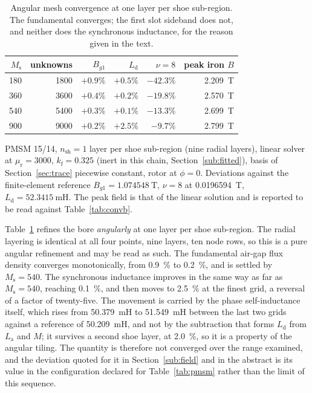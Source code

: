 \documentclass[10pt,a4paper,twocolumn]{article}
\theoremstyle{plain}
\theoremstyle{remark}
\begin{document}
\begin{table}[!t]
\centering
\begin{threeparttable}
\footnotesize
\begin{tabular}{rrrrrr}
\toprule
$M_{\mathrm{s}}$ & unknowns & $B_{g1}$ & $L_{\mathrm{d}}$ & $\nu=8$
& peak iron $B$\\
\midrule
180 & \num{1800} & $+0.9\%$ & $+0.5\%$ & $-42.3\%$ & \SI{2.209}{\tesla}\\
360 & \num{3600} & $+0.4\%$ & $+0.2\%$ & $-19.8\%$ & \SI{2.570}{\tesla}\\
540 & \num{5400} & $+0.3\%$ & $+0.1\%$ & $-13.3\%$ & \SI{2.699}{\tesla}\\
900 & \num{9000} & $+0.2\%$ & $+2.5\%$ & $-9.7\%$  & \SI{2.799}{\tesla}\\
\bottomrule
\end{tabular}
\begin{tablenotes}[flushleft]\footnotesize
\item PMSM 15/14, $n_{\mathrm{sh}}=1$ layer per shoe sub-region (nine radial
layers), linear solver at $\mu_{\mathrm{r}}=\num{3000}$,
$k_{\mathrm{f}}=\num{0.325}$ (inert in this chain, Section~\ref{sub:fitted}), basis of Section~\ref{sec:trace}
piecewise constant, rotor at $\phi=0$. Deviations against the
finite-element reference $B_{g1}=\SI{1.074548}{\tesla}$,
$\nu=8$ at \SI{0.0196594}{\tesla},
$L_{\mathrm{d}}=\SI{52.3415}{\milli\henry}$. The peak field is that of
the linear solution and is reported to be read against
Table~\ref{tab:convb}.
\end{tablenotes}
\end{threeparttable}
\caption{Angular mesh convergence at one layer per shoe sub-region.
The fundamental converges; the first slot sideband does not, and neither
does the synchronous inductance, for the reason given in the text.}
\label{tab:conva}
\end{table}

Table~\ref{tab:conva} refines the bore \emph{angularly} at one layer per
shoe sub-region. The radial layering is identical at all four points, nine layers, ten node rows, so this is a pure angular refinement and
may be read as such. The fundamental air-gap flux density converges
monotonically, from \SI{+0.9}{\percent} to \SI{+0.2}{\percent}, and is
settled by $M_{\mathrm{s}}=540$. The synchronous inductance improves in
the same way as far as $M_{\mathrm{s}}=540$, reaching
\SI{+0.1}{\percent}, and then moves to \SI{+2.5}{\percent} at the finest
grid, a reversal of a factor of twenty-five. The movement is carried by
the phase self-inductance itself, which rises from \SI{50.379}{\milli\henry}
to \SI{51.549}{\milli\henry} between the last two grids against a
reference of \SI{50.209}{\milli\henry}, and not by the subtraction that
forms $L_{\mathrm{d}}$ from $L_{\mathrm{a}}$ and $M$; it survives a second
shoe layer, at \SI{+2.0}{\percent}, so it is a property of the angular
tiling. The quantity is therefore not converged over the range examined,
and the deviation quoted for it in Section~\ref{sub:field} and in the
abstract is its value in the configuration declared for
Table~\ref{tab:pmsm} rather than the limit of this sequence.
\end{document}
